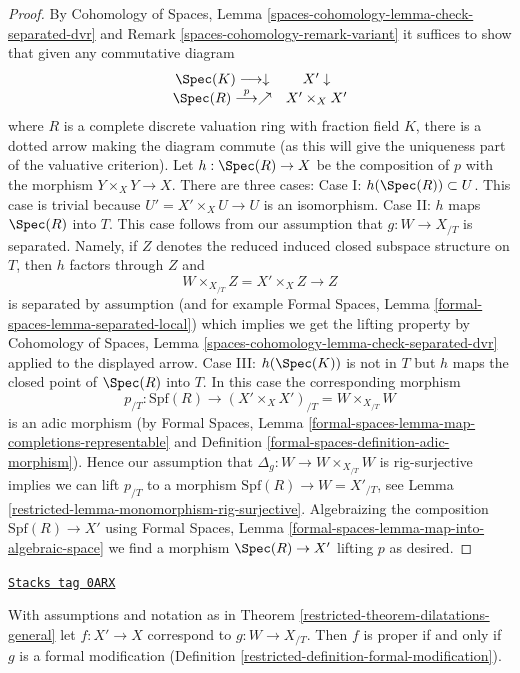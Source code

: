 \begin{proof}
\medskip\noindent
By Cohomology of Spaces, Lemma
\ref{spaces-cohomology-lemma-check-separated-dvr} and
Remark \ref{spaces-cohomology-remark-variant}
it suffices to show that given any commutative diagram
$$
\begin{array}{cc}\Spec(K) \longrightarrow\downarrow & X' \downarrow \\ \Spec(R) \overset{p}{\longrightarrow}\nearrow & X' \times_X X'\end{array}
$$
where $R$ is a complete discrete valuation ring with fraction field $K$,
there is a dotted arrow making the diagram commute (as this will
give the uniqueness part of the valuative criterion). Let
$h : \Spec(R) \to X$ be the composition of $p$ with the morphism
$Y \times_X Y \to X$. There are three cases:
Case I: $h(\Spec(R)) \subset U$. This case is trivial
because $U' = X' \times_X U \to U$ is an isomorphism.
Case II: $h$ maps $\Spec(R)$ into $T$. This case follows
from our assumption that $g : W \to X_{/T}$ is separated. Namely,
if $Z$ denotes the reduced induced closed subspace structure
on $T$, then $h$ factors through $Z$ and
$$
W \times_{X_{/T}} Z = X' \times_X Z \longrightarrow Z
$$
is separated by assumption (and for example
Formal Spaces, Lemma \ref{formal-spaces-lemma-separated-local})
which implies we get the lifting property by
Cohomology of Spaces, Lemma \ref{spaces-cohomology-lemma-check-separated-dvr}
applied to the displayed arrow. Case III: $h(\Spec(K))$ is not in $T$
but $h$ maps the closed point of $\Spec(R)$ into $T$. In this case
the corresponding morphism
$$
p_{/T} :
\text{Spf}(R)
\longrightarrow
(X' \times_X X')_{/T} =
W \times_{X_{/T}} W
$$
is an adic morphism (by
Formal Spaces, Lemma
\ref{formal-spaces-lemma-map-completions-representable} and
Definition \ref{formal-spaces-definition-adic-morphism}).
Hence our assumption that
$\Delta_g : W \to W \times_{X_{/T}} W$ is rig-surjective implies we can lift
$p_{/T}$ to a morphism $\text{Spf}(R) \to W = X'_{/T}$, see
Lemma \ref{restricted-lemma-monomorphism-rig-surjective}.
Algebraizing the composition $\text{Spf}(R) \to X'$ using
Formal Spaces, Lemma \ref{formal-spaces-lemma-map-into-algebraic-space}
we find a morphism $\Spec(R) \to X'$ lifting $p$ as desired.
\end{proof}

\begin{lemma}
\label{restricted-lemma-output-proper}
\href{https://stacks.math.columbia.edu/tag/0ARX}{\texttt{Stacks tag 0ARX}}

With assumptions and notation as in Theorem \ref{restricted-theorem-dilatations-general}
let $f : X' \to X$ correspond to $g : W \to X_{/T}$.
Then $f$ is proper if and only if $g$ is a formal modification
(Definition \ref{restricted-definition-formal-modification}).
\end{lemma}


